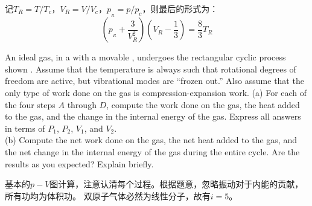 \begin{solution}
    记$T_R = T/T_c$，$V_R = V/V_c$，$p_{_R} = p/p_c$，则最后的形式为：
    \begin{equation*}
        (p_{_R}+\frac{3}{V_R^{2}})(V_R-\frac{1}{3})=\frac{8}{3}T_R
    \end{equation*}
\end{solution}
\begin{solution}
    An ideal  gas, in a  with a movable , undergoes the rectangular cyclic process shown
    . Assume that the temperature is always such
    that rotational degrees of freedom are active, but vibrational modes are “frozen out.” Also assume that the only
    type of work done on the gas is  compression-expansion work.
    (a) For each of the four steps $A$ through $D$, compute the work done on the gas, the heat added to
    the gas, and the change in the internal energy of the gas.
    Express all answers in terms of $P_1$, $P_2$, $V_1$, and $V_2$. \\
    (b) Compute the net work done on the gas, the net
    heat added to the gas, and the net change in the internal
    energy of the gas during the entire cycle. Are the results
    as you expected? Explain briefly.

    \tcbrule

    基本的$p-V$图计算，注意认清每个过程。根据题意，忽略振动对于内能的贡献，所有功均为体积功。
    双原子气体必然为线性分子，故有$i = 5$。


\end{solution}
